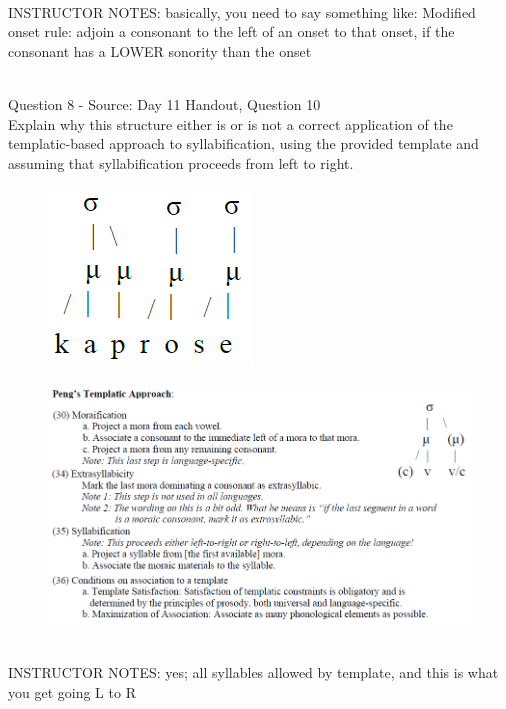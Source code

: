 \documentclass[12pt]{article}
\begin{document}
~\\
INSTRUCTOR NOTES: basically, you need to say something like: Modified onset rule: adjoin a consonant to the left of an onset to that onset, if the consonant has a LOWER sonority than the onset


~\\

{\large Question 8} - Source: Day 11 Handout, Question 10\\

Explain why this structure either is or is not a correct application of the templatic-based approach to syllabification, using the provided template and assuming that syllabification proceeds from left to right.\\

\begin{figure}[H]
\includegraphics{../images/pengtemplate_kaprose_yes.png}
\end{figure}
\begin{figure}[H]
\includegraphics{../images/peng_template_withdiagram.png}
\end{figure}

~\\
INSTRUCTOR NOTES: yes; all syllables allowed by template, and this is what you get going L to R


~\\
\end{document}
